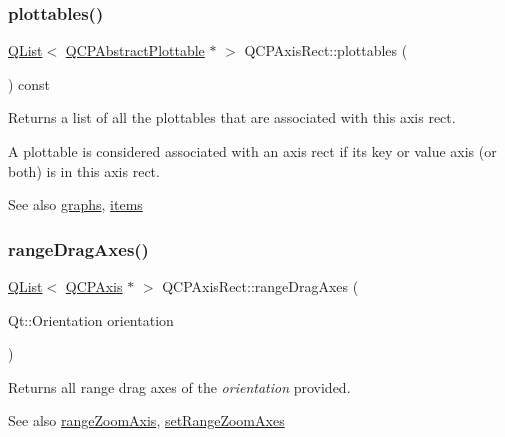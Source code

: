 \mbox{\label{class_q_c_p_axis_rect_a587d073a97b27bc7293fab4b2774ad59}} 
\subsubsection{\texorpdfstring{plottables()}{plottables()}}
{\footnotesize\ttfamily \hyperlink{class_q_list}{Q\+List}$<$ \hyperlink{class_q_c_p_abstract_plottable}{Q\+C\+P\+Abstract\+Plottable} $\ast$ $>$ Q\+C\+P\+Axis\+Rect\+::plottables (\begin{DoxyParamCaption}{ }\end{DoxyParamCaption}) const}

Returns a list of all the plottables that are associated with this axis rect.

A plottable is considered associated with an axis rect if its key or value axis (or both) is in this axis rect.

\begin{DoxySeeAlso}{See also}
\hyperlink{class_q_c_p_axis_rect_a2d9ded3eca97be1fcb5867949391bb88}{graphs}, \hyperlink{class_q_c_p_axis_rect_a03c113a2175448300ee8f944e24776ba}{items} 
\end{DoxySeeAlso}
\mbox{\label{class_q_c_p_axis_rect_aae5f99a044ca911685a306f01b7ff941}} 
\subsubsection{\texorpdfstring{range\+Drag\+Axes()}{rangeDragAxes()}}
{\footnotesize\ttfamily \hyperlink{class_q_list}{Q\+List}$<$ \hyperlink{class_q_c_p_axis}{Q\+C\+P\+Axis} $\ast$ $>$ Q\+C\+P\+Axis\+Rect\+::range\+Drag\+Axes (\begin{DoxyParamCaption}\item[{Qt\+::\+Orientation}]{orientation }\end{DoxyParamCaption})}

Returns all range drag axes of the {\itshape orientation} provided.

\begin{DoxySeeAlso}{See also}
\hyperlink{class_q_c_p_axis_rect_a679c63f2b8daccfe6ec5110dce3dd3b6}{range\+Zoom\+Axis}, \hyperlink{class_q_c_p_axis_rect_a9442cca2aa358405f39a64d51eca13d2}{set\+Range\+Zoom\+Axes} 
\end{DoxySeeAlso}
\mbox{\label{class_q_c_p_axis_rect_a6d7c22cfc54fac7a3d6ef80b133a8574}} 
